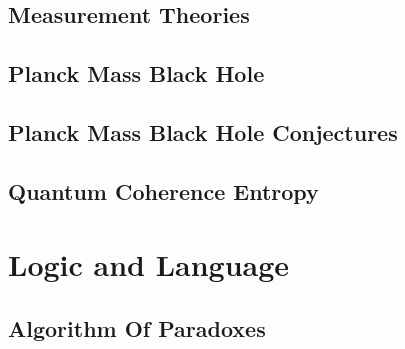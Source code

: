\documentclass{report}
\begin{document}
%

\chapter{Measurement Theories}


\chapter{Planck Mass Black Hole}


%

%

\chapter{Planck Mass Black Hole Conjectures}


\chapter{Quantum Coherence Entropy}


\part{Logic and Language}

\chapter{Algorithm Of Paradoxes}

\end{document}
